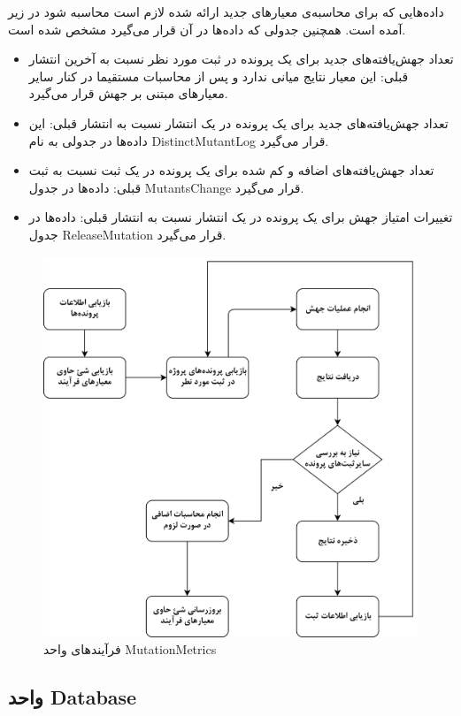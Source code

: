  داده‌هایی که برای محاسبه‌ی معیارهای جدید ارائه شده لازم است محاسبه شود در زیر آمده است. همچنین جدولی که داده‌ها در آن قرار می‌گیرد مشخص شده است.
\begin{itemize}
	\item
	تعداد جهش‌یافته‌های جدید برای یک پرونده در ثبت مورد نظر نسبت به آخرین انتشار قبلی: این معیار نتایج میانی ندارد و پس از محاسبات مستقیما در کنار سایر معیارهای مبتنی بر جهش قرار می‌گیرد. 

\item 
تعداد جهش‌یافته‌های جدید برای یک پرونده در یک انتشار نسبت به 
انتشار قبلی: این داده‌ها در جدولی به نام DistinctMutantLog قرار می‌گیرد.

\item 
تعداد جهش‌یافته‌های اضافه و کم شده برای یک پرونده در یک ثبت نسبت به ثبت قبلی: داده‌ها در جدول MutantsChange قرار می‌گیرد.

\item
تغییرات امتیاز جهش برای یک پرونده در یک انتشار نسبت به انتشار قبلی: داده‌ها در جدول  ReleaseMutation قرار می‌گیرد. 

\end{itemize}

\begin{figure}[H]
	\centering
	\includegraphics[width=.7\textwidth]{img/method/MutationMetrics-Chart.png}
	\caption{ فرآیند‌های واحد MutationMetrics}
	\label{fig:mutationmetircs-chart}
\end{figure}

\subsection{واحد Database}


